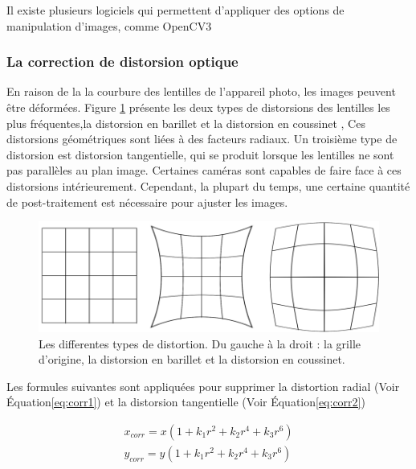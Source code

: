 \documentclass[
]{article}
\begin{document}
Il existe plusieurs logiciels qui permettent d'appliquer des options de manipulation d'images, comme OpenCV3\citep{noauthor_opencv_2015}

\hypertarget{la-correction-de-distorsion-optique}{%
\subsubsection*{La correction de distorsion optique}\label{la-correction-de-distorsion-optique}}

En raison de la la courbure des lentilles de l'appareil photo, les images peuvent être déformées. Figure \ref{fig:lens} présente les deux types de distorsions des lentilles les plus fréquentes,la distorsion en barillet et la distorsion en coussinet \citep{fryer_lens_1986} , Ces distorsions géométriques sont liées à des facteurs radiaux. Un troisième type de distorsion est distorsion tangentielle, qui se produit lorsque les lentilles ne sont pas parallèles au plan
image. Certaines caméras sont capables de faire face à ces distorsions
intérieurement. Cependant, la plupart du temps, une certaine quantité de post-traitement est
nécessaire pour ajuster les images.



\begin{figure}
\includegraphics[width=1\linewidth]{images/lens} \caption{Les differentes types de distortion. Du gauche à la droit : la grille d'origine, la distorsion en barillet et la distorsion en coussinet.}\label{fig:lens}
\end{figure}

Les formules suivantes sont appliquées pour supprimer la distortion radial (Voir Équation\eqref{eq:corr1}) et la distorsion tangentielle (Voir Équation\eqref{eq:corr2})

\begin{equation}
\begin{aligned}
  x_{corr} = x\left(1+k_1r^2+k_2r^4+k_3r^6\right)
  \\y_{corr} = y\left(1+k_1r^2+k_2r^4+k_3r^6\right)
\end{aligned}
 \label{eq:corr1}
\end{equation}
\end{document}
